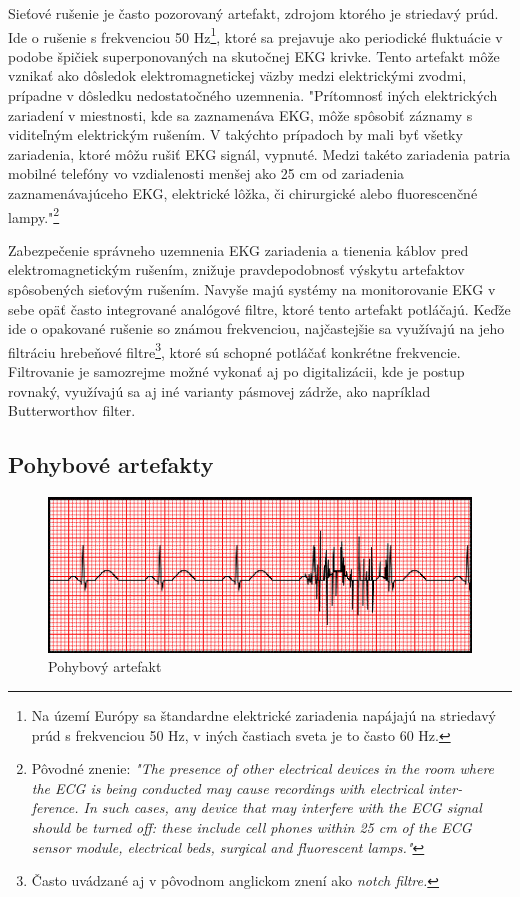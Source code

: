 Sieťové rušenie je často pozorovaný artefakt, zdrojom ktorého je striedavý prúd. Ide o rušenie s frekvenciou 50 Hz\footnote{Na území Európy sa štandardne elektrické zariadenia napájajú na striedavý prúd s frekvenciou 50 Hz, v iných častiach sveta je to často 60 Hz.}, ktoré sa prejavuje ako periodické fluktuácie v podobe špičiek superponovaných na skutočnej EKG krivke. Tento artefakt môže vznikať ako dôsledok elektromagnetickej väzby medzi elektrickými zvodmi, prípadne v dôsledku nedostatočného uzemnenia.\cite{Huhta1973} "Prítomnosť iných elektrických zariadení v miestnosti, kde sa zaznamenáva EKG, môže spôsobiť záznamy s viditeľným elektrickým rušením. V takýchto prípadoch by mali byť všetky zariadenia, ktoré môžu rušiť EKG signál, vypnuté. Medzi takéto zariadenia patria mobilné telefóny vo vzdialenosti menšej ako 25 cm od zariadenia zaznamenávajúceho EKG, elektrické lôžka, či chirurgické alebo fluorescenčné lampy."\footnote{Pôvodné znenie: \textit{"The presence of other electrical devices in the room where the ECG is being conducted may cause recordings with electrical inter- ference. In such cases, any device that may interfere with the ECG signal should be turned off: these include cell phones within 25 cm of the ECG sensor module, electrical beds, surgical and fluorescent lamps."}}\cite{PrezRiera2017}

Zabezpečenie správneho uzemnenia EKG zariadenia a tienenia káblov pred elektromagnetickým rušením,  znižuje pravdepodobnosť výskytu artefaktov spôsobených sieťovým rušením. Navyše majú systémy na monitorovanie EKG v sebe opäť často integrované analógové filtre, ktoré tento artefakt potláčajú. Keďže ide o opakované rušenie so známou frekvenciou, najčastejšie sa využívajú na jeho filtráciu hrebeňové filtre\footnote{Často uvádzané aj v pôvodnom anglickom znení ako \textit{notch filtre.}}, ktoré sú schopné potláčať konkrétne frekvencie. Filtrovanie je samozrejme možné vykonať aj po digitalizácii, kde je postup rovnaký, využívajú sa aj iné varianty pásmovej zádrže, ako napríklad Butterworthov filter.\cite{Gilani2018}

\subsection{Pohybové artefakty}

\begin{figure}[H]
    \centering
    \includegraphics[scale=0.7]{img/tremor.jpg}
    \caption{Pohybový artefakt\cite{Mauvila_2018}}
\end{figure}

